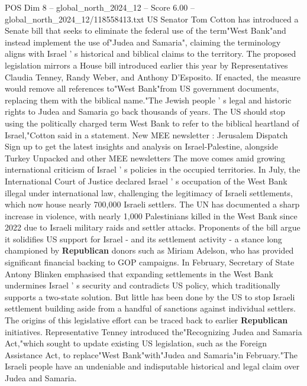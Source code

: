 \begin{textsample}{POS Dim 8 – global\_north\_2024\_12 – Score 6.00 – global\_north\_2024\_12/118558413.txt}  \label{ex:f8_pos_344}
US Senator Tom Cotton has introduced a Senate bill that seeks to eliminate the federal use of the term"West Bank"and instead implement the use of"Judea and Samaria", claiming the terminology aligns with Israel ' s historical and biblical claims to the territory.
The proposed legislation mirrors a House bill introduced earlier this year by Representatives Claudia Tenney, Randy Weber, and Anthony D'Esposito.
If enacted, the measure would remove all references to"West Bank"from US government documents, replacing them with the biblical name."The Jewish people ' s legal and historic rights to Judea and Samaria go back thousands of years.
The US should stop using the politically charged term West Bank to refer to the biblical heartland of Israel,"Cotton said in a statement.
New MEE newsletter : Jerusalem Dispatch Sign up to get the latest insights and analysis on Israel-Palestine, alongside Turkey Unpacked and other MEE newsletters The move comes amid growing international criticism of Israel ' s policies in the occupied territories.
In July, the International Court of Justice declared Israel ' s occupation of the West Bank illegal under international law, challenging the legitimacy of Israeli settlements, which now house nearly 700,000 Israeli settlers.
The UN has documented a sharp increase in violence, with nearly 1,000 Palestinians killed in the West Bank since 2022 due to Israeli military raids and settler attacks.
Proponents of the bill argue it solidifies US support for Israel - and its settlement activity - a stance long championed by \textbf{Republican} donors such as Miriam Adelson, who has provided significant financial backing to GOP campaigns.
In February, Secretary of State Antony Blinken emphasised that expanding settlements in the West Bank undermines Israel ' s security and contradicts US policy, which traditionally supports a two-state solution.
But little has been done by the US to stop Israeli settlement building aside from a handful of sanctions against individual settlers.
The origins of this legislative effort can be traced back to earlier \textbf{Republican} initiatives.
Representative Tenney introduced the"Recognizing Judea and Samaria Act,"which sought to update existing US legislation, such as the Foreign Assistance Act, to replace"West Bank"with"Judea and Samaria"in February."The Israeli people have an undeniable and indisputable historical and legal claim over Judea and Samaria.

\end{textsample}
